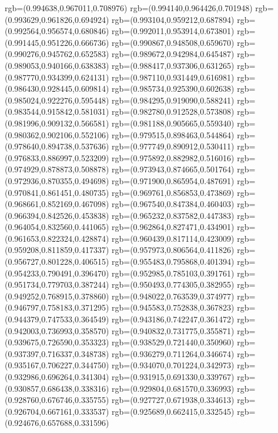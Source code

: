 {{{			rgb=(0.994638,0.967011,0.708976)
			rgb=(0.994140,0.964426,0.701948)
			rgb=(0.993629,0.961826,0.694924)
			rgb=(0.993104,0.959212,0.687894)
			rgb=(0.992564,0.956574,0.680846)
			rgb=(0.992011,0.953914,0.673801)
			rgb=(0.991445,0.951226,0.666736)
			rgb=(0.990867,0.948508,0.659670)
			rgb=(0.990276,0.945762,0.652583)
			rgb=(0.989672,0.942984,0.645487)
			rgb=(0.989053,0.940166,0.638383)
			rgb=(0.988417,0.937306,0.631265)
			rgb=(0.987770,0.934399,0.624131)
			rgb=(0.987110,0.931449,0.616981)
			rgb=(0.986430,0.928445,0.609814)
			rgb=(0.985734,0.925390,0.602638)
			rgb=(0.985024,0.922276,0.595448)
			rgb=(0.984295,0.919090,0.588241)
			rgb=(0.983544,0.915842,0.581031)
			rgb=(0.982780,0.912528,0.573808)
			rgb=(0.981996,0.909132,0.566581)
			rgb=(0.981188,0.905665,0.559340)
			rgb=(0.980362,0.902106,0.552106)
			rgb=(0.979515,0.898463,0.544864)
			rgb=(0.978640,0.894738,0.537636)
			rgb=(0.977749,0.890912,0.530411)
			rgb=(0.976833,0.886997,0.523209)
			rgb=(0.975892,0.882982,0.516016)
			rgb=(0.974929,0.878873,0.508878)
			rgb=(0.973943,0.874665,0.501764)
			rgb=(0.972936,0.870355,0.494698)
			rgb=(0.971900,0.865954,0.487691)
			rgb=(0.970841,0.861451,0.480735)
			rgb=(0.969761,0.856853,0.473869)
			rgb=(0.968661,0.852169,0.467098)
			rgb=(0.967540,0.847384,0.460403)
			rgb=(0.966394,0.842526,0.453838)
			rgb=(0.965232,0.837582,0.447383)
			rgb=(0.964054,0.832560,0.441065)
			rgb=(0.962864,0.827471,0.434901)
			rgb=(0.961653,0.822324,0.428874)
			rgb=(0.960439,0.817114,0.423009)
			rgb=(0.959208,0.811859,0.417337)
			rgb=(0.957973,0.806564,0.411826)
			rgb=(0.956727,0.801228,0.406515)
			rgb=(0.955483,0.795868,0.401394)
			rgb=(0.954233,0.790491,0.396470)
			rgb=(0.952985,0.785103,0.391761)
			rgb=(0.951734,0.779703,0.387244)
			rgb=(0.950493,0.774305,0.382955)
			rgb=(0.949252,0.768915,0.378860)
			rgb=(0.948022,0.763539,0.374977)
			rgb=(0.946797,0.758183,0.371295)
			rgb=(0.945583,0.752838,0.367823)
			rgb=(0.944379,0.747533,0.364549)
			rgb=(0.943186,0.742247,0.361472)
			rgb=(0.942003,0.736993,0.358570)
			rgb=(0.940832,0.731775,0.355871)
			rgb=(0.939675,0.726590,0.353323)
			rgb=(0.938529,0.721440,0.350960)
			rgb=(0.937397,0.716337,0.348738)
			rgb=(0.936279,0.711264,0.346674)
			rgb=(0.935167,0.706227,0.344750)
			rgb=(0.934070,0.701224,0.342973)
			rgb=(0.932986,0.696264,0.341304)
			rgb=(0.931915,0.691330,0.339767)
			rgb=(0.930857,0.686438,0.338316)
			rgb=(0.929804,0.681570,0.336993)
			rgb=(0.928760,0.676746,0.335755)
			rgb=(0.927727,0.671938,0.334613)
			rgb=(0.926704,0.667161,0.333537)
			rgb=(0.925689,0.662415,0.332545)
			rgb=(0.924676,0.657688,0.331596)
}}}
